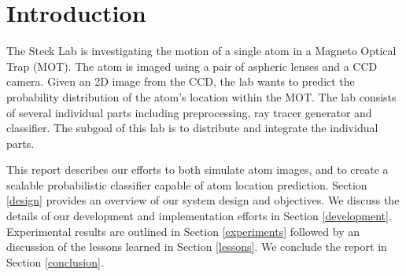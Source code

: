 \section{Introduction}

The Steck Lab is investigating the motion of a single atom in a Magneto Optical Trap (MOT).  The atom is imaged using a pair of aspheric lenses and a CCD camera.  Given an 2D image from the CCD, the lab wants to predict the probability distribution of the atom's location within the MOT. The lab consists of several individual parts including preprocessing, ray tracer generator and classifier. The subgoal of this lab is to distribute and integrate the individual parts.

This report describes our efforts to both simulate atom images, and to create a scalable probabilistic classifier capable of atom location prediction.  Section \ref{design} provides an overview of our system design and objectives.  We discuss the details of our development and implementation efforts in Section \ref{development}.  Experimental results are outlined in Section \ref{experiments} followed by an discussion of the lessons learned in Section \ref{lessons}. We conclude the report in Section \ref{conclusion}.
